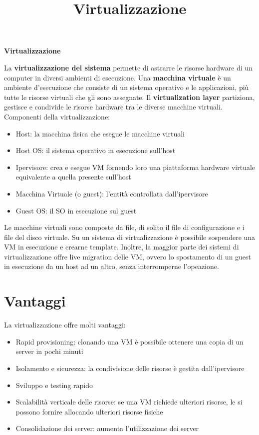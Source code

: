 \documentclass[12pt]{article}
\title{Virtualizzazione}
\begin{document}
\begin{center}
    \Huge\textbf{Virtualizzazione}
\end{center}
La \textbf{virtualizzazione del sistema} permette di astrarre le risorse hardware di un computer in diversi ambienti di
esecuzione. Una \textbf{macchina virtuale} è un ambiente d'esecuzione che consiste di un sistema operativo e le 
applicazioni, più tutte le risorse virtuali che gli sono assegnate. Il \textbf{virtualization layer} partiziona,
gestisce e condivide le risorse hardware tra le diverse macchine virtuali.\\
Componenti della virtualizzazione:
\begin{itemize}
    \item Host: la macchina fisica che esegue le macchine virtuali
    \item Host OS: il sistema operativo in esecuzione sull'host
    \item Ipervisore: crea e esegue VM fornendo loro una piattaforma hardware virtuale equivalente a quella presente
    sull'host
    \item Macchina Virtuale (o guest): l'entità controllata dall'ipervisore
    \item Guest OS: il SO in esecuzione sul guest
\end{itemize}
Le macchine virtuali sono composte da file, di solito il file di configurazione e i file del disco virtuale.
Su un sistema di virtualizzazione è possibile sospendere una VM in esecuzione e crearne template.
Inoltre, la maggior parte dei sistemi di virtualizzazione offre live migration delle VM, ovvero lo spostamento di un
guest in esecuzione da un host ad un altro, senza interromperne l'opeazione.
\section{Vantaggi}
La virtualizzazione offre molti vantaggi:
\begin{itemize}
    \item Rapid provisioning: clonando una VM è possibile ottenere una copia di un server in pochi minuti
    \item Isolamento e sicurezza: la condivisione delle risorse è gestita dall'ipervisore
    \item Sviluppo e testing rapido
    \item Scalabilità verticale delle risorse: se una VM richiede ulteriori risorse, le si possono fornire allocando 
    ulteriori risorse fisiche
    \item Consolidazione dei server: aumenta l'utilizzazione dei server
\end{itemize}
\end{document}
